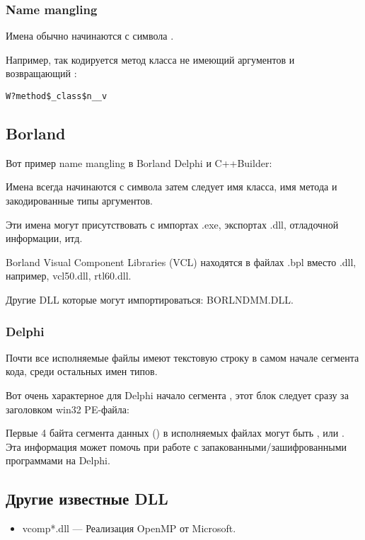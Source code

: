 \subsubsection{Name mangling}

Имена обычно начинаются с символа .

Например, так кодируется метод  класса  не имеющий аргументов и возвращающий \Tvoid{}:

\begin{lstlisting}
W?method$_class$n__v
\end{lstlisting}

\subsection{Borland}

Вот пример \gls{name mangling} в Borland Delphi и C++Builder:



Имена всегда начинаются с символа  
затем следует имя класса, имя метода
и закодированные типы аргументов.

Эти имена могут присутствовать с импортах .exe, экспортах .dll, отладочной информации, итд.

Borland Visual Component Libraries (VCL) находятся в файлах .bpl вместо .dll, например, vcl50.dll, rtl60.dll.

Другие DLL которые могут импортироваться: BORLNDMM.DLL.

\subsubsection{Delphi}

Почти все исполняемые файлы имеют текстовую строку  
в самом начале сегмента кода, среди остальных имен типов.

Вот очень характерное для Delphi начало сегмента , 
этот блок следует сразу за заголовком win32 PE-файла:



Первые 4 байта сегмента данных () в исполняемых файлах могут быть ,  или .
Эта информация может помочь при работе с запакованными/зашифрованными программами на Delphi.

\subsection{Другие известные DLL}

\begin{itemize}
\item vcomp*.dll --- Реализация OpenMP от Microsoft.
\end{itemize}

